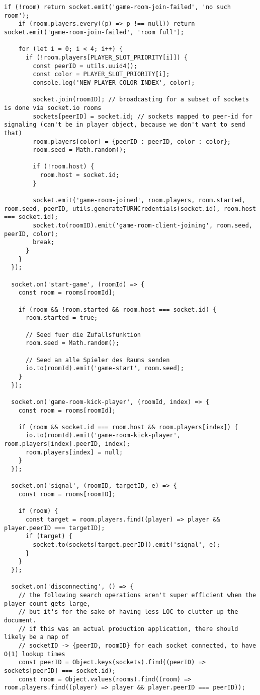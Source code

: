 \begin{singlespace}
\begin{lstlisting}[]
    if (!room) return socket.emit('game-room-join-failed', 'no such room');
    if (room.players.every((p) => p !== null)) return socket.emit('game-room-join-failed', 'room full');

    for (let i = 0; i < 4; i++) {
      if (!room.players[PLAYER_SLOT_PRIORITY[i]]) {
        const peerID = utils.uuid4();
        const color = PLAYER_SLOT_PRIORITY[i];
        console.log('NEW PLAYER COLOR INDEX', color);

        socket.join(roomID); // broadcasting for a subset of sockets is done via socket.io rooms
        sockets[peerID] = socket.id; // sockets mapped to peer-id for signaling (can't be in player object, because we don't want to send that)
        room.players[color] = {peerID : peerID, color : color};
        room.seed = Math.random();

        if (!room.host) {
          room.host = socket.id;
        }

        socket.emit('game-room-joined', room.players, room.started, room.seed, peerID, utils.generateTURNCredentials(socket.id), room.host === socket.id);
        socket.to(roomID).emit('game-room-client-joining', room.seed, peerID, color);
        break;
      }
    }
  });

  socket.on('start-game', (roomId) => {
    const room = rooms[roomId];

    if (room && !room.started && room.host === socket.id) {
      room.started = true;

      // Seed fuer die Zufallsfunktion
      room.seed = Math.random();

      // Seed an alle Spieler des Raums senden
      io.to(roomId).emit('game-start', room.seed);
    }
  });

  socket.on('game-room-kick-player', (roomId, index) => {
    const room = rooms[roomId];

    if (room && socket.id === room.host && room.players[index]) {
      io.to(roomId).emit('game-room-kick-player', room.players[index].peerID, index);
      room.players[index] = null;
    }
  });

  socket.on('signal', (roomID, targetID, e) => {
    const room = rooms[roomID];

    if (room) {
      const target = room.players.find((player) => player && player.peerID === targetID);
      if (target) {
        socket.to(sockets[target.peerID]).emit('signal', e);
      }
    }
  });

  socket.on('disconnecting', () => {
    // the following search operations aren't super efficient when the player count gets large,
    // but it's for the sake of having less LOC to clutter up the document.
    // if this was an actual production application, there should likely be a map of
    // socketID -> {peerID, roomID} for each socket connected, to have O(1) lookup times
    const peerID = Object.keys(sockets).find((peerID) => sockets[peerID] === socket.id);
    const room = Object.values(rooms).find((room) => room.players.find((player) => player && player.peerID === peerID));


\end{lstlisting}
\end{singlespace}
